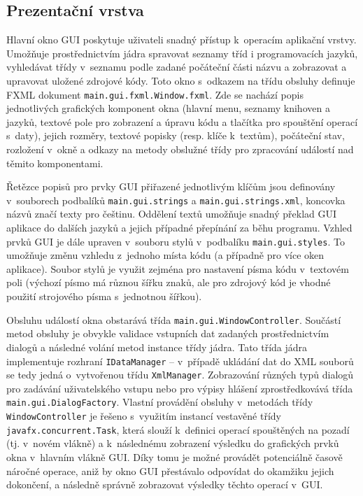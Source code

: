 \documentclass[czech,BP]{thesiskiv}
\begin{document}
\subsection{Prezentační vrstva}
Hlavní okno GUI poskytuje uživateli snadný přístup k~operacím aplikační vrstvy. Umožňuje prostřednictvím jádra spravovat seznamy tříd i programovacích jazyků, vyhledávat třídy v~seznamu podle zadané počáteční části názvu a zobrazovat a upravovat uložené zdrojové kódy. Toto okno s~odkazem na třídu obsluhy definuje FXML dokument \texttt{main.gui.fxml.Window.fxml}. Zde se nachází popis jednotlivých grafických komponent okna (hlavní menu, seznamy knihoven a jazyků, textové pole pro zobrazení a úpravu kódu a tlačítka pro spouštění operací s~daty), jejich rozměry, textové popisky (resp. klíče k~textům), počáteční stav, rozložení v~okně a odkazy na metody obslužné třídy pro zpracování událostí nad těmito komponentami.\par
Řetězce popisů pro prvky GUI přiřazené jednotlivým klíčům jsou definovány v~souborech podbalíků \texttt{main.gui.strings} a \texttt{main.gui.strings.xml}, koncovka názvů  značí texty pro češtinu. Oddělení textů umožňuje snadný překlad GUI aplikace do dalších jazyků a jejich případné přepínání za běhu programu. Vzhled prvků GUI je dále upraven v~souboru stylů v~podbalíku \texttt{main.gui.styles}. To umožňuje změnu vzhledu z~jednoho místa kódu (a případně pro více oken aplikace). Soubor stylů je využit zejména pro nastavení písma kódu v~textovém poli (výchozí písmo má různou šířku znaků, ale pro zdrojový kód je vhodné použití strojového písma s~jednotnou šířkou).\par
Obsluhu událostí okna obstarává třída \texttt{main.gui.WindowController}. Součástí metod obsluhy je obvykle validace vstupních dat zadaných prostřednictvím dialogů a následné volání metod instance třídy jádra. Tato třída jádra implementuje rozhraní \texttt{IDataManager} -- v~případě ukládání dat do XML souborů se tedy jedná o~vytvořenou třídu \texttt{XmlManager}. Zobrazování různých typů dialogů pro zadávání uživatelského vstupu nebo pro výpisy hlášení zprostředkovává třída \texttt{main.gui.DialogFactory}. Vlastní provádění obsluhy v~metodách třídy \texttt{WindowController} je řešeno s~využitím instancí vestavěné třídy \texttt{javafx.concurrent.Task}, která slouží k~definici operací spouštěných na pozadí (tj. v~novém vlákně) a k~následnému zobrazení výsledku do grafických prvků okna v~hlavním vlákně GUI. Díky tomu je možné provádět potenciálně časově náročné operace, aniž by okno GUI přestávalo odpovídat do okamžiku jejich dokončení, a následně správně zobrazovat výsledky těchto operací v~GUI.\par
\end{document}
